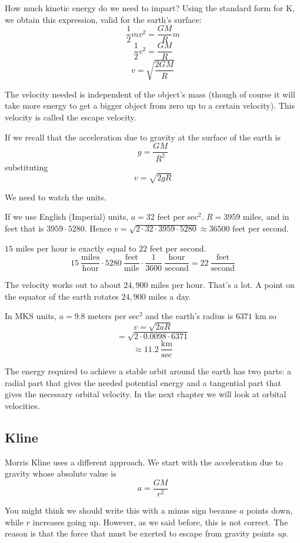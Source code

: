 \documentclass[11pt, oneside]{article}
\begin{document}
How much kinetic energy do we need to impart?  Using the standard form for K, we obtain this expression, valid for the earth's surface:
\[ \frac{1}{2}mv^2 = \frac{GM}{R} m \]
\[ \frac{1}{2}v^2 = \frac{GM}{R} \]
\[ v = \sqrt{ \frac{2GM}{R}} \]

The velocity needed is independent of the object's mass (though of course it will take more energy to get a bigger object from zero up to a certain velocity).  This velocity is called the escape velocity.

If we recall that the acceleration due to gravity at the surface of the earth is
\[ g = \frac{GM}{R^2} \]
substituting
\[ v = \sqrt{2gR} \]

We need to watch the units.  

If we use English (Imperial) units, $a = 32$ feet per sec$^2$.  $R = 3959$ miles, and in feet that is $3959 \cdot 5280$.  Hence $v = \sqrt{2 \cdot 32 \cdot 3959 \cdot 5280} \approx 36500$ feet per second.  

$15$ miles per hour is exactly equal to $22$ feet per second.
\[ 15 \ \frac{\text{miles}}{\text{hour}} \cdot 5280 \ \frac{\text{feet}}{\text{mile}} \cdot \frac{1}{3600} \ \frac{\text{hour}}{\text{second}} =  22 \ \frac{\text{feet}}{\text{second}} \]

The velocity works out to about $24,900$ miles per hour.  That's a lot.  A point on the equator of the earth rotates $24,900$ miles a day.

In MKS units, $a = 9.8$ meters per sec$^2$ and the earth's radius is $6371$ km so 
\[ v = \sqrt{2aR} \]
\[ = \sqrt{2 \cdot 0.0098 \cdot 6371} \]
\[ \approx 11.2 \ \frac{\text{km}}{\text{sec}} \]

The energy required to achieve a stable orbit around the earth has two parts:  a radial part that gives the needed potential energy and a tangential part that gives the necessary orbital velocity.  In the next chapter we will look at orbital velocities.  

\subsection*{Kline}

Morris Kline uses a different approach.  We start with the acceleration due to gravity whose absolute value is
\[ a = \frac{GM}{r^2} \]

You might think we should write this with a minus sign because $a$ points down, while $r$ increases going up.  However, as we said before, this is not correct.  The reason is that the force that must be exerted to escape from gravity points \emph{up}.
\end{document}
